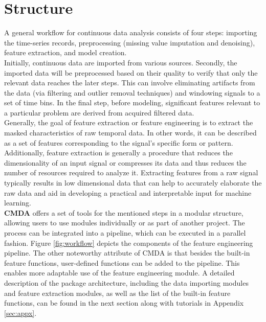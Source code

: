 \documentclass{article}
\begin{document}
\section{Structure}
A general workflow for continuous data analysis consists of four steps: importing the time-series records, preprocessing (missing value imputation and denoising), feature extraction, and model creation.\\
Initially, continuous data are imported from various sources. Secondly, the imported data will be preprocessed based on their quality to verify that only the relevant data reaches the later steps. This can involve eliminating artifacts from the data (via filtering and outlier removal techniques) and windowing signals to a set of time bins. In the final step, before modeling, significant features relevant to a particular problem are derived from acquired filtered data.\\
Generally, the goal of feature extraction or feature engineering is to extract the masked characteristics of raw temporal data. In other words, it can be described as a set of features corresponding to the signal's specific form or pattern. Additionally, feature extraction is generally a procedure that reduces the dimensionality of an input signal or compresses its data and thus reduces the number of resources required to analyze it.
Extracting features from a raw signal typically results in low dimensional data that can help to accurately elaborate the raw data and aid in developing a practical and interpretable input for machine learning.\\
\textbf{CMDA} offers a set of tools for the mentioned steps in a modular structure, allowing users to use modules individually or as part of another project. The process can be integrated into a pipeline, which can be executed in a parallel fashion.
Figure \ref{fig:workflow} depicts the components of the feature engineering pipeline. The other noteworthy attribute of CMDA is that besides the built-in feature functions, user-defined functions can be added to the pipeline. This enables more adaptable use of the feature engineering module.
A detailed description of the package architecture, including the data importing modules and feature extraction modules, as well as the list of the built-in feature functions, can be found in the next section along with tutorials in Appendix \ref{sec:appx}.
\end{document}
